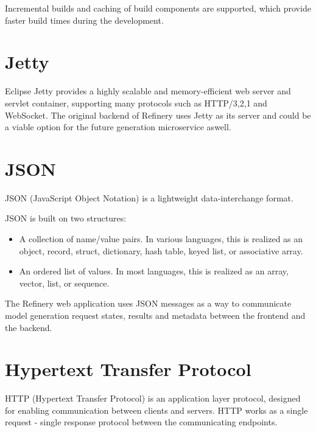 	Incremental builds and caching of build components are supported, which provide faster build times during the development.

\section{Jetty}
	Eclipse Jetty \cite{jetty} provides a highly scalable and memory-efficient web server and servlet container, supporting many protocols
	 such as HTTP/3,2,1 and WebSocket. The original backend of Refinery uses Jetty as its server and could be a viable option for the future generation
	 microservice aswell.

\section{JSON}
	JSON (JavaScript Object Notation) \cite{json} is a lightweight data-interchange format. 

	JSON is built on two structures:
	\begin{itemize}
		\item A collection of name/value pairs. In various languages, this is realized as an object, record, struct, dictionary, hash table, 
		keyed list, or associative array.
		\item An ordered list of values. In most languages, this is realized as an array, vector, list, or sequence.
	\end{itemize}

	The Refinery web application uses JSON messages as a way to communicate model generation request states, results and metadata between the frontend and the backend.

\section{Hypertext Transfer Protocol}
	HTTP (Hypertext Transfer Protocol) \cite{httpdoc} is an application layer protocol, designed for enabling communication between clients and servers. 
	HTTP works as a single request - single response protocol between the communicating endpoints.

